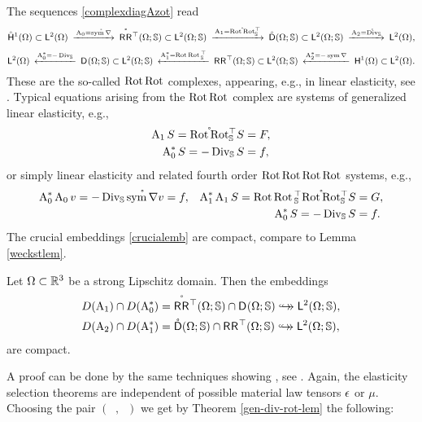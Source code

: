 \documentclass[a4paper]{amsart}
\renewcommand{\dc}{\mathring\dsymbol}
\DeclareMathOperator{\Az}{A_{0}}
\DeclareMathOperator{\Azs}{A_{0}^{*}}
\DeclareMathOperator{\Ao}{A_{1}}
\DeclareMathOperator{\Aos}{A_{1}^{*}}
\DeclareMathOperator{\At}{A_{2}}
\newcommand{\grad}{\na}
\newcommand{\cptemb}{\hookto\hspace*{-0.85em}\hookto}
\newcommand{\bbS}{\mathbb{S}}
\begin{document}
The sequences \eqref{complexdiagAzot} read
$$\small\begin{CD}
\hocom\subset\ltom @> \A_{0}=\mathring{\sym\grad} >>
\mathring{\r\r}{}^{\top}(\om;\bbS)\subset\lt(\om;\bbS) @> \A_{1}=\mathring{\Rot\Rot}{}^{\top}_{\bbS} >>
\dc(\om;\bbS)\subset\lt(\om;\bbS) @> \A_{2}=\mathring{\Div}_{\bbS} >>
\ltom,
\end{CD}$$
$$\small\begin{CD}
\ltom @< \A_{0}^{*}=-\Div_{\bbS} <<
\d(\om;\bbS)\subset\lt(\om;\bbS) @< \A_{1}^{*}=\Rot\Rot{}^{\top}_{\bbS} <<
\r\r{}^{\top}(\om;\bbS)\subset\lt(\om;\bbS) @< \A_{2}^{*}=-\sym\grad <<
\hoom\subset\ltom.
\end{CD}$$
These are the so-called $\operatorname{Rot}\operatorname{Rot}$ complexes, appearing, e.g., 
in linear elasticity, see \cite{paulyzulehnerbiharmonic}.
Typical equations arising from the $\operatorname{Rot}\operatorname{Rot}$ complex are
systems of generalized linear elasticity, e.g.,
\begin{align*}
\A_{1}S=\mathring{\Rot\Rot}{}^{\top}_{\bbS}S&=F,\\
\A_{0}^{*}S=-\Div_{\bbS}S&=f,
\end{align*}
or simply linear elasticity and related fourth order $\operatorname{Rot}\operatorname{Rot}\operatorname{Rot}\operatorname{Rot}$ systems, e.g.,
\begin{align*}
\A_{0}^{*}\A_{0}v=-\Div_{\bbS}\mathring{\sym\grad}v&=f,
&
\A_{1}^{*}\A_{1}S=\Rot\Rot{}^{\top}_{\bbS}\mathring{\Rot\Rot}{}^{\top}_{\bbS}S&=G,\\
&&
\A_{0}^{*}S=-\Div_{\bbS}S&=f.
\end{align*}
The crucial embeddings \eqref{crucialemb}
are compact, compare to Lemma \ref{weckstlem}.

\begin{lem}
\label{elastlem}
Let $\Omega\subset\mathbb{R}^{3}$ be a strong Lipschitz domain.
Then the embeddings
\begin{align*}
D(\Ao)\cap D(\Azs)&=\mathring{\r\r}{}^{\top}(\om;\bbS)\cap\d(\om;\bbS)\cptemb\lt(\om;\bbS),\\
D(\At)\cap D(\Aos)&=\dc(\om;\bbS)\cap\r\r{}^{\top}(\om;\bbS)\cptemb\lt(\om;\bbS),
\end{align*}
are compact.
\end{lem}

A proof can be done by the same techniques showing \cite[Lemma 3.22]{paulyzulehnerbiharmonic},
see \cite{paulyschomburgzulehnerelasticity}.
Again, the elasticity selection theorems are independent of possible material law tensors $\epsilon$ or $\mu$.
Choosing the pair $(\Az,\Ao)$ we get by Theorem \ref{gen-div-rot-lem} the following:
\end{document}
